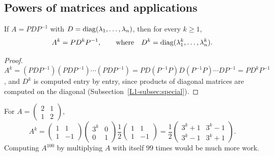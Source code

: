 \subsection{Powers of matrices and applications}

\begin{proposition}\label{L1-prop:powers}
    If $A = PDP^{-1}$ with $D = \operatorname{diag}(\lambda_1, \ldots, \lambda_n)$, then for every $k \geq 1$,
    \[A^k = P D^k P^{-1}, \qquad \text{where} \quad D^k = \operatorname{diag}(\lambda_1^k, \ldots, \lambda_n^k).\]
\end{proposition}

\begin{proof}
    $A^k = (PDP^{-1})(PDP^{-1}) \cdots (PDP^{-1}) = PD(P^{-1}P)D(P^{-1}P) \cdots DP^{-1} = PD^kP^{-1}$, and $D^k$ is computed entry by entry, since products of diagonal matrices are computed on the diagonal (Subsection~\ref{L1-subsec:special}).
\end{proof}

\begin{example}
    For $A = \begin{pmatrix} 2 & 1 \\ 1 & 2 \end{pmatrix}$,
    \[A^k = \begin{pmatrix} 1 & 1 \\ 1 & -1 \end{pmatrix} \begin{pmatrix} 3^k & 0 \\ 0 & 1 \end{pmatrix} \frac{1}{2}\begin{pmatrix} 1 & 1 \\ 1 & -1 \end{pmatrix} = \frac{1}{2} \begin{pmatrix} 3^k + 1 & 3^k - 1 \\ 3^k - 1 & 3^k + 1 \end{pmatrix}.\]
    Computing $A^{100}$ by multiplying $A$ with itself $99$ times would be much more work.
\end{example}

